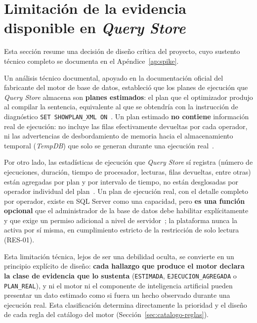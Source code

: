 \documentclass[11pt,a4paper]{report}
\begin{document}
\section{Limitaci\'on de la evidencia disponible en \textit{Query Store}}
\label{sec:limitacion-evidencia}

Esta secci\'on resume una decisi\'on de dise\~no cr\'itica del proyecto, cuyo sustento t\'ecnico completo se documenta en el Ap\'endice~\ref{ap:spike}.

Un an\'alisis t\'ecnico documental, apoyado en la documentaci\'on oficial del fabricante del motor de base de datos, estableci\'o que los planes de ejecuci\'on que \textit{Query Store} almacena son \textbf{planes estimados}: el plan que el optimizador produjo al compilar la sentencia, equivalente al que se obtendr\'ia con la instrucci\'on de diagn\'ostico \texttt{SET SHOWPLAN\_XML ON}~\cite{R3}. Un plan estimado \textbf{no contiene} informaci\'on real de ejecuci\'on: no incluye las filas efectivamente devueltas por cada operador, ni las advertencias de desbordamiento de memoria hacia el almacenamiento temporal (\textit{TempDB}) que solo se generan durante una ejecuci\'on real~\cite{R6}.

Por otro lado, las estad\'isticas de ejecuci\'on que \textit{Query Store} s\'i registra (n\'umero de ejecuciones, duraci\'on, tiempo de procesador, lecturas, filas devueltas, entre otras) est\'an agregadas por plan y por intervalo de tiempo, no est\'an desglosadas por operador individual del plan~\cite{R5}. Un plan de ejecuci\'on real, con el detalle completo por operador, existe en SQL Server como una capacidad, pero \textbf{es una funci\'on opcional} que el administrador de la base de datos debe habilitar expl\'icitamente y que exige un permiso adicional a nivel de servidor~\cite{R7}; la plataforma nunca la activa por s\'i misma, en cumplimiento estricto de la restricci\'on de solo lectura (RES-01).

Esta limitaci\'on t\'ecnica, lejos de ser una debilidad oculta, se convierte en un principio expl\'icito de dise\~no: \textbf{cada hallazgo que produce el motor declara la clase de evidencia que lo sustenta} (\texttt{ESTIMADA}, \texttt{EJECUCION\_AGREGADA} o \texttt{PLAN\_REAL}), y ni el motor ni el componente de inteligencia artificial pueden presentar un dato estimado como si fuera un hecho observado durante una ejecuci\'on real. Esta clasificaci\'on determina directamente la prioridad y el dise\~no de cada regla del cat\'alogo del motor (Secci\'on~\ref{sec:catalogo-reglas}).
\end{document}
